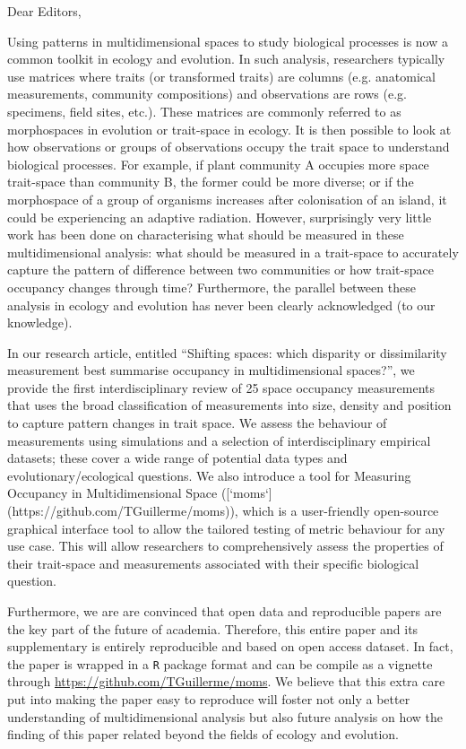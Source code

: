 \documentclass[11pt]{letter}
\begin{document}
\begin{letter}{}
\opening{Dear Editors,}

Using patterns in multidimensional spaces to study biological processes is now a common toolkit in ecology and evolution.
In such analysis, researchers typically use matrices where traits (or transformed traits) are columns (e.g. anatomical measurements, community compositions) and observations are rows (e.g. specimens, field sites, etc.).
These matrices are commonly referred to as morphospaces in evolution or trait-space in ecology.
It is then possible to look at how observations or groups of observations occupy the trait space to understand biological processes.
For example, if plant community A occupies more space trait-space than community B, the former could be more diverse;
or if the morphospace of a group of organisms increases after colonisation of an island, it could be experiencing an adaptive radiation.
However, surprisingly very little work has been done on characterising what should be measured in these multidimensional analysis: what should be measured in a trait-space to accurately capture the pattern of difference between two communities or how trait-space occupancy changes through time?
Furthermore, the parallel between these analysis in ecology and evolution has never been clearly acknowledged (to our knowledge).

In our research article, entitled ``Shifting spaces: which disparity or dissimilarity measurement best summarise occupancy in multidimensional spaces?'', we provide the first interdisciplinary review of 25 space occupancy measurements that uses the broad classification of measurements into size, density and position to capture pattern changes in trait space.
We assess the behaviour of measurements using simulations and a selection of interdisciplinary empirical datasets; these cover a wide range of potential data types and evolutionary/ecological questions.
We also introduce a tool for Measuring Occupancy in Multidimensional Space ([`moms`](https://github.com/TGuillerme/moms)), which is a user-friendly open-source graphical interface tool to allow the tailored testing of metric behaviour for any use case.
This will allow researchers to comprehensively assess the properties of their trait-space and measurements associated with their specific biological question.

Furthermore, we are are convinced that open data and reproducible papers are the key part of the future of academia.
Therefore, this entire paper and its supplementary is entirely reproducible and based on open access dataset.
In fact, the paper is wrapped in a \texttt{R} package format and can be compile as a vignette through \url{https://github.com/TGuillerme/moms}.
We believe that this extra care put into making the paper easy to reproduce will foster not only a better understanding of multidimensional analysis but also future analysis on how the finding of this paper related beyond the fields of ecology and evolution.


\end{letter}
\end{document}
